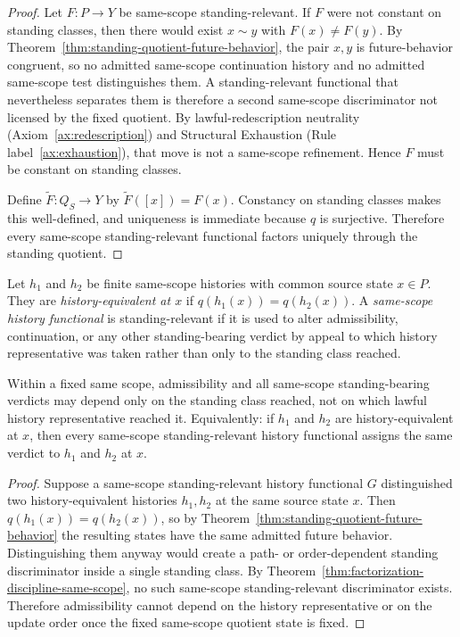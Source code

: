 \begin{proof}
Let $F:P\to Y$ be same-scope standing-relevant. If $F$ were not constant on standing classes, then there would exist $x\sim y$ with $F(x)\neq F(y)$. By Theorem~\ref{thm:standing-quotient-future-behavior}, the pair $x,y$ is future-behavior congruent, so no admitted same-scope continuation history and no admitted same-scope test distinguishes them. A standing-relevant functional that nevertheless separates them is therefore a second same-scope discriminator not licensed by the fixed quotient. By lawful-redescription neutrality (Axiom~\ref{ax:redescription}) and Structural Exhaustion (Rule label~\ref{ax:exhaustion}), that move is not a same-scope refinement. Hence $F$ must be constant on standing classes.

Define $\widetilde F:Q_S\to Y$ by $\widetilde F([x])=F(x)$. Constancy on standing classes makes this well-defined, and uniqueness is immediate because $q$ is surjective. Therefore every same-scope standing-relevant functional factors uniquely through the standing quotient.
\end{proof}

\begin{definition}\label{def:history-equivalent-same-scope-histories}
Let $h_1$ and $h_2$ be finite same-scope histories with common source state $x\in P$. They are \emph{history-equivalent at $x$} if $q(h_1(x))=q(h_2(x))$. A \emph{same-scope history functional} is standing-relevant if it is used to alter admissibility, continuation, or any other standing-bearing verdict by appeal to which history representative was taken rather than only to the standing class reached.
\end{definition}

\begin{theorem}\label{thm:history-factorization-no-path-dependent-admissibility}
Within a fixed same scope, admissibility and all same-scope standing-bearing verdicts may depend only on the standing class reached, not on which lawful history representative reached it. Equivalently: if $h_1$ and $h_2$ are history-equivalent at $x$, then every same-scope standing-relevant history functional assigns the same verdict to $h_1$ and $h_2$ at $x$.
\end{theorem}

\begin{proof}
Suppose a same-scope standing-relevant history functional $G$ distinguished two history-equivalent histories $h_1,h_2$ at the same source state $x$. Then $q(h_1(x))=q(h_2(x))$, so by Theorem~\ref{thm:standing-quotient-future-behavior} the resulting states have the same admitted future behavior. Distinguishing them anyway would create a path- or order-dependent standing discriminator inside a single standing class. By Theorem~\ref{thm:factorization-discipline-same-scope}, no such same-scope standing-relevant discriminator exists. Therefore admissibility cannot depend on the history representative or on the update order once the fixed same-scope quotient state is fixed.
\end{proof}

